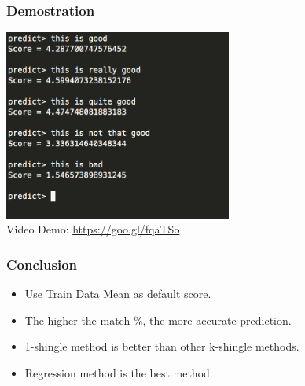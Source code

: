 \documentclass[11pt]{beamer}
\begin{document}
\begin{frame}
\frametitle{Demostration}

	\begin{center}
		\includegraphics[width=7.5cm]{demo} \\
		Video Demo: \url{https://goo.gl/fqaTSo}
	\end{center}

\end{frame}

\begin{frame}
\frametitle{Conclusion}

	\begin{itemize}
		[square]
		\item Use Train Data Mean as default score.
		\item The higher the match \%, the more accurate prediction.
		\item 1-shingle method is better than other k-shingle methods.
		\item Regression method is the best method.
	\end{itemize}
\end{frame}
\end{document}
